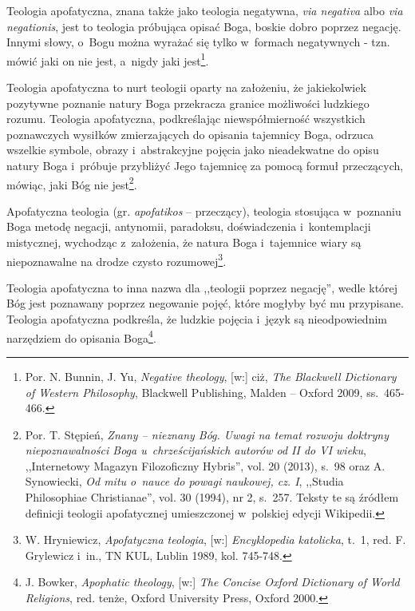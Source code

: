 \begin{defin}\label{int-deftn-fi}
Teologia apofatyczna, znana także jako teologia negatywna, \textit{via negativa} albo \textit{via negationis}, jest to teologia próbująca opisać Boga, boskie dobro poprzez negację. Innymi słowy, o~Bogu można wyrażać się tylko w~formach negatywnych - tzn. mówić jaki on nie jest, a~nigdy jaki jest\footnote{Por. N. Bunnin, J. Yu, \textit{Negative theology}, [w:] ciż, \textit{The Blackwell Dictionary of Western Philosophy}, Blackwell Publishing, Malden -- Oxford 2009, ss.~465-466.}.
\end{defin}
\begin{defin}
Teologia apofatyczna to nurt teologii oparty na założeniu, że jakiekolwiek pozytywne poznanie natury Boga przekracza granice możliwości ludzkiego rozumu. Teologia apofatyczna, podkreślając niewspółmierność wszystkich poznawczych wysiłków zmierzających do opisania tajemnicy Boga, odrzuca wszelkie symbole, obrazy i~abstrakcyjne pojęcia jako nieadekwatne do opisu natury Boga i~próbuje przybliżyć Jego tajemnicę za pomocą formuł przeczących, mówiąc, jaki Bóg nie jest\footnote{Por. T. Stępień, \textit{Znany -- nieznany Bóg. Uwagi na temat rozwoju doktryny niepoznawalności Boga u~chrześcijańskich autorów od II do VI wieku}, ,,Internetowy Magazyn Filozoficzny Hybris'', vol. 20 (2013), s.~98 oraz A. Synowiecki, \textit{Od mitu o~nauce do powagi naukowej, cz. I}, ,,Studia Philosophiae Christianae'', vol. 30 (1994), nr 2, s.~257. Teksty te są źródłem definicji teologii apofatycznej umieszczonej w~polskiej edycji Wikipedii.}.
\end{defin}
\begin{defin}
Apofatyczna teologia (gr. \textit{apofatikos} -- przeczący), teologia stosująca w~poznaniu Boga metodę negacji, antynomii, paradoksu, doświadczenia i~kontemplacji mistycznej, wychodząc z~założenia, że natura Boga i~tajemnice wiary są niepoznawalne na drodze czysto rozumowej\footnote{W. Hryniewicz, \textit{Apofatyczna teologia}, [w:] \textit{Encyklopedia katolicka}, t.~1, red. F. Grylewicz i~in., TN KUL, Lublin 1989, kol. 745-748.}.
\end{defin}
\begin{defin}
Teologia apofatyczna to inna nazwa dla ,,teologii poprzez negację'', wedle której Bóg jest poznawany poprzez negowanie pojęć, które mogłyby być mu przypisane. Teologia apofatyczna podkreśla, że ludzkie pojęcia i~język są nieodpowiednim narzędziem do opisania Boga\footnote{J. Bowker, \textit{Apophatic theology}, [w:] \textit{The Concise Oxford Dictionary of World Religions}, red. tenże, Oxford University Press, Oxford 2000.}.
\end{defin}
